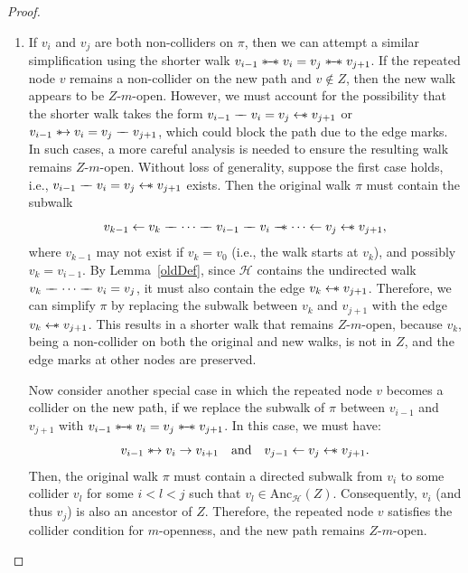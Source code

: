 \documentclass[accepted]{uai2025} %
\newcommand{\anc}{\text{Anc}}
\newcommand{\tuh}{\mathrel{\rightarrow}}
\newcommand{\hut}{\mathrel{\leftarrow}}
\newcommand{\hus}{\mathrel{{\leftarrow\mkern-11mu\ast}}}
\newcommand{\suh}{\mathrel{{\ast\mkern-11mu\to}}}
\newcommand{\tus}{\mathrel{{\relbar\mkern-11mu\relbar\mkern-11mu\ast}}}
\newcommand{\sus}{\mathrel{{\ast\mkern-11mu\relbar\mkern-9mu\relbar\mkern-11mu\ast}}}
\newcommand{\tut}{\mathrel{{\relbar\mkern-9mu\relbar}}}
\begin{document}
\begin{proof}
\begin{enumerate}
\begin{enumerate}
        \item If \( v_i \) and \( v_j \) are both non-colliders on \( \pi \), then we can attempt a similar simplification using the shorter walk \( v_{i-1} \sus v_i = v_j \sus v_{j+1} \). If the repeated node \( v \) remains a non-collider on the new path and \( v \notin Z \), then the new walk appears to be \( Z \)-\( m \)-open. However, we must account for the possibility that the shorter walk takes the form \( v_{i-1} \tut v_i = v_j \hus v_{j+1} \) or \( v_{i-1} \suh v_i = v_j \tut v_{j+1} \), which could block the path due to the edge marks. In such cases, a more careful analysis is needed to ensure the resulting walk remains \( Z \)-\( m \)-open. Without loss of generality, suppose the first case holds, i.e., \( v_{i-1} \tut v_i = v_j \hus v_{j+1} \) exists. Then the original walk \( \pi \) must contain the subwalk
        \[
        v_{k-1} \hut v_k \tut \cdots \tut v_{i-1} \tut v_i \tus \cdots \hut v_j \hus v_{j+1},
        \]
        where \( v_{k-1} \) may not exist if \( v_k = v_0 \) (i.e., the walk starts at \( v_k \)), and possibly \( v_k = v_{i-1} \).
        By Lemma~\ref{oldDef}, since \( \mathcal{H} \) contains the undirected walk \( v_k \tut \cdots \tut v_i = v_j \), it must also contain the edge \( v_k \hus v_{j+1} \). Therefore, we can simplify \( \pi \) by replacing the subwalk between \( v_k \) and \( v_{j+1} \) with the edge \( v_k \hus v_{j+1} \). This results in a shorter walk that remains \( Z \)-\( m \)-open, because \( v_k \), being a non-collider on both the original and new walks, is not in \( Z \), and the edge marks at other nodes are preserved.

        Now consider another special case in which the repeated node \( v \) becomes a collider on the new path, if we replace the subwalk of \( \pi \) between \( v_{i-1} \) and \( v_{j+1} \) with \( v_{i-1} \sus v_i = v_j \sus v_{j+1} \). In this case, we must have:
        \[
        v_{i-1} \suh v_i \tuh v_{i+1} \quad \text{and} \quad v_{j-1} \hut v_j \hus v_{j+1}.
        \]
        Then, the original walk \( \pi \) must contain a directed subwalk from \( v_i \) to some collider \( v_l \) for some \( i < l < j \) such that \( v_l \in \anc_{\mathcal{H}}(Z) \). Consequently, \( v_i \) (and thus \( v_j \)) is also an ancestor of \( Z \). Therefore, the repeated node \( v \) satisfies the collider condition for \( m \)-openness, and the new path remains \( Z \)-\( m \)-open.
                

\end{enumerate}
\end{enumerate}
\end{proof}
\end{document}
